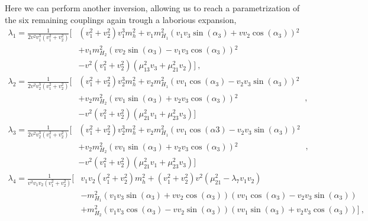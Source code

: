 \documentclass[10pt]{book}
\renewcommand{\(}{\left(}
\renewcommand{\)}{\right)}
\renewcommand{\[}{\left[}
\renewcommand{\]}{\right]}
\begin{document}
Here we can perform another inversion, allowing us to reach a parametrization of the six remaining couplings again trough a laborious expansion, 
\begin{equation}
\begin{split}
\lambda_1 = \frac{1}{2 v^2 v_1^3 \left(v_1^2+v_2^2\right)} \Bigg[ & \left(v_1^2+v_2^2\right) v_1^3 m_h^2+v_1 m_{H_1}^2 \left(v_1 v_3 \sin (\alpha_3)+v v_2 \cos (\alpha_3)\right){}^2 \\ & + v_1 m_{H_2}^2 \left(v v_2 \sin(\alpha_3)-v_1 v_3 \cos (\alpha_3)\right){}^2 \\ & -v^2 \left(v_1^2+v_2^2\right) \left(\mu_{13}^2 v_3+\mu_{21}^2 v_2 \right) \Bigg] \ ,
\end{split} 
\end{equation}
%
\begin{equation}
\begin{split}
\lambda_2 = \frac{1}{2 v^2 v_2^3 \left(v_1^2+v_2^2\right)} \Bigg[ & \left(v_1^2+v_2^2\right) v_2^3 m_h^2+v_2 m_{H_1}^2 \left(v v_1 \cos (\alpha_3) - v_2 v_3 \sin (\alpha_3)\right){}^2 \\ & +v_2 m_{H_2}^2 \left(v v_1 \sin (\alpha_3)+v_2 v_3 \cos (\alpha_3)\right){}^2 \\ & -v^2 \left(v_1^2+v_2^2\right) \left(\mu_{21}^2 v_1+\mu_{23}^2 v_3\right) \Bigg] 
\end{split} \ , 
\end{equation}
%
\begin{equation}
\begin{split}
\lambda_3  = \frac{1}{2 v^2 v_2^3 \left(v_1^2+v_2^2\right)} \Bigg[ & \left(v_1^2+v_2^2\right) v_2^3 m_h^2+v_2 m_{H_1}^2 \left(v v_1 \cos (\text{$\alpha $3})-v_2 v_3 \sin (\alpha_3)\right){}^2 \\ & +v_2 m_{H_2}^2 \left(v v_1 \sin (\alpha_3)  + v_2 v_3 \cos (\alpha_3)\right){}^2  \\ & - v^2 \left(v_1^2+v_2^2\right) \left(\mu_{21}^2 v_1+\mu_{23}^2 v_3\right) \Bigg]  
\end{split} \ ,
\end{equation}
%
\begin{equation}
\begin{split}
\lambda_4 = \frac{1}{v^2 v_1 v_2 \left(v_1^2+v_2^2\right)} \Bigg[ & v_1 v_2 \left(v_1^2+v_2^2\right) m_h^2 + \left(v_1^2+v_2^2\right) v^2 \left(\mu_{21}^2-\lambda_7 v_1 v_2\right) \\ & -m_{H_1}^2 \left(v_1 v_3 \sin (\alpha_3)+v v_2 \cos (\alpha_3)\right) \left(v v_1 \cos (\alpha_3)  -v_2 v_3 \sin (\alpha_3)\right) \\ & + m_{H_2}^2 \left(v_1 v_3 \cos (\alpha_3)- v v_2 \sin (\alpha_3)\right) \left(v v_1 \sin (\alpha_3)+v_2 v_3 \cos (\alpha_3)\right)   \Bigg] \ , 
\end{split} 
\end{equation}
\end{document}
